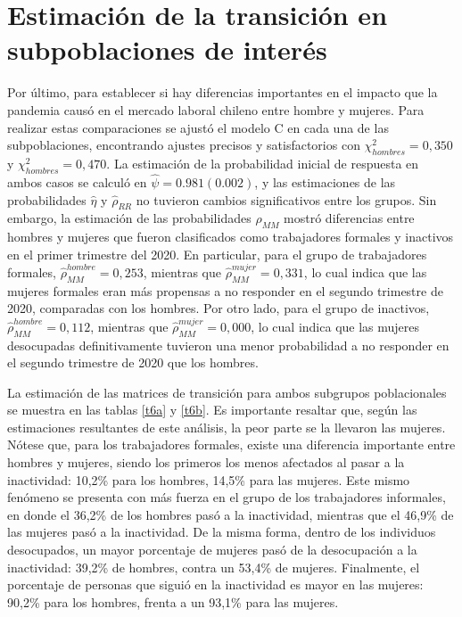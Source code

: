\documentclass[
  10pt,
  spanish,
]{book}
\begin{document}
\hypertarget{estimaciuxf3n-de-la-transiciuxf3n-en-subpoblaciones-de-interuxe9s}{%
\section{Estimación de la transición en subpoblaciones de interés}\label{estimaciuxf3n-de-la-transiciuxf3n-en-subpoblaciones-de-interuxe9s}}

Por último, para establecer si hay diferencias importantes en el impacto que la pandemia causó en el mercado laboral chileno entre hombre y mujeres. Para realizar estas comparaciones se ajustó el modelo C en cada una de las subpoblaciones, encontrando ajustes precisos y satisfactorios con \(\chi^2_{hombres} = 0,350\) y \(\chi^2_{hombres} = 0,470\). La estimación de la probabilidad inicial de respuesta en ambos casos se calculó en \(\hat{\psi}=0.981 (0.002)\), y las estimaciones de las probabilidades \(\hat{\eta}\) y \(\hat{\rho}_{RR}\) no tuvieron cambios significativos entre los grupos. Sin embargo, la estimación de las probabilidades \(\hat{\rho}_{MM}\) mostró diferencias entre hombres y mujeres que fueron clasificados como trabajadores formales y inactivos en el primer trimestre del 2020. En particular, para el grupo de trabajadores formales, \(\hat{\rho}_{MM}^{hombre} = 0,253\), mientras que \(\hat{\rho}_{MM}^{mujer} = 0,331\), lo cual indica que las mujeres formales eran más propensas a no responder en el segundo trimestre de 2020, comparadas con los hombres. Por otro lado, para el grupo de inactivos, \(\hat{\rho}_{MM}^{hombre} = 0,112\), mientras que \(\hat{\rho}_{MM}^{mujer} = 0,000\), lo cual indica que las mujeres desocupadas definitivamente tuvieron una menor probabilidad a no responder en el segundo trimestre de 2020 que los hombres.

La estimación de las matrices de transición para ambos subgrupos poblacionales se muestra en las tablas \ref{t6a} y \ref{t6b}. Es importante resaltar que, según las estimaciones resultantes de este análisis, la peor parte se la llevaron las mujeres. Nótese que, para los trabajadores formales, existe una diferencia importante entre hombres y mujeres, siendo los primeros los menos afectados al pasar a la inactividad: 10,2\% para los hombres, 14,5\% para las mujeres. Este mismo fenómeno se presenta con más fuerza en el grupo de los trabajadores informales, en donde el 36,2\% de los hombres pasó a la inactividad, mientras que el 46,9\% de las mujeres pasó a la inactividad. De la misma forma, dentro de los individuos desocupados, un mayor porcentaje de mujeres pasó de la desocupación a la inactividad: 39,2\% de hombres, contra un 53,4\% de mujeres. Finalmente, el porcentaje de personas que siguió en la inactividad es mayor en las mujeres: 90,2\% para los hombres, frenta a un 93,1\% para las mujeres.
\end{document}
